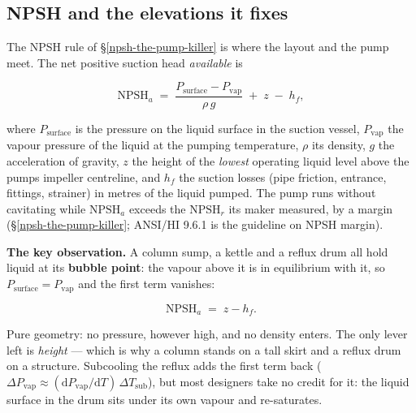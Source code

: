 \documentclass[11pt,a4paper]{article}
\begin{document}
\hypertarget{npsh-and-the-elevations-it-fixes}{%
\subsection{NPSH and the elevations it
fixes}\label{npsh-and-the-elevations-it-fixes}}

The NPSH rule of \S\ref{npsh-the-pump-killer} is where the layout and
the pump meet. The net positive suction head \emph{available} is

\[
\mathrm{NPSH}_a \;=\; \frac{P_\mathrm{surface}-P_\mathrm{vap}}{\rho\,g}
\;+\; z \;-\; h_f ,
\]

where \(P_\mathrm{surface}\) is the pressure on the liquid surface in the
suction vessel, \(P_\mathrm{vap}\) the vapour pressure of the liquid at
the pumping temperature, \(\rho\) its density, \(g\) the acceleration of
gravity, \(z\) the height of the \emph{lowest} operating liquid level
above the pump\textquotesingle s impeller centreline, and \(h_f\) the
suction losses (pipe friction, entrance, fittings, strainer) in metres of
the liquid pumped. The pump runs without cavitating while
\(\mathrm{NPSH}_a\) exceeds the \(\mathrm{NPSH}_r\) its maker measured, by
a margin (\S\ref{npsh-the-pump-killer}; ANSI/HI 9.6.1 is the guideline on
NPSH margin).

\textbf{The key observation.} A column sump, a kettle and a reflux drum
all hold liquid at its \textbf{bubble point}: the vapour above it is in
equilibrium with it, so \(P_\mathrm{surface} = P_\mathrm{vap}\) and the
first term vanishes:

\[
\mathrm{NPSH}_a \;=\; z - h_f .
\]

Pure geometry: no pressure, however high, and no density enters. The
only lever left is \emph{height} --- which is why a column stands on a
tall skirt and a reflux drum on a structure. Subcooling the reflux adds
the first term back (\(\Delta P_\mathrm{vap} \approx
(\mathrm{d}P_\mathrm{vap}/\mathrm{d}T)\,\Delta T_\mathrm{sub}\)), but most
designers take no credit for it: the liquid surface in the drum sits
under its own vapour and re-saturates.
\end{document}
